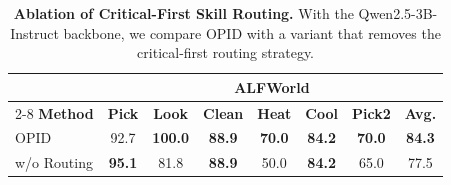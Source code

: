 \begin{table}[ht!]
\centering
\caption{
    \textbf{Ablation of Critical-First Skill Routing.}
    With the Qwen2.5-3B-Instruct backbone, we compare OPID with a variant that removes the critical-first routing strategy.
}
\vspace{0.05in}
\label{tab:ablation_critical_first}
\small
\renewcommand{\arraystretch}{1.08}
\begin{tabular}{lccccccc}
\toprule
& \multicolumn{7}{c}{\textbf{ALFWorld}} \\
\cmidrule(lr){2-8}
\textbf{Method}
& \textbf{Pick} & \textbf{Look} & \textbf{Clean} & \textbf{Heat} & \textbf{Cool} & \textbf{Pick2} & \textbf{Avg.} \\
\midrule
\rowcolor{gray!10}
OPID
    & 92.7 & \textbf{100.0} & \textbf{88.9} & \textbf{70.0} & \textbf{84.2} & \textbf{70.0} & \textbf{84.3}
    \\
\;\;\;w/o Routing
    & \textbf{95.1} & 81.8 & \textbf{88.9} & 50.0 & \textbf{84.2} & 65.0 & 77.5
    \\
\bottomrule
\end{tabular}
\end{table}